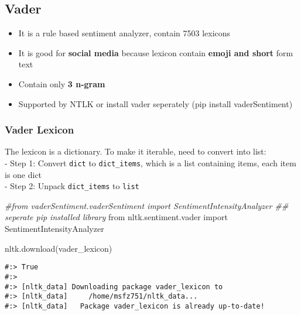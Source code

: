 \documentclass[
]{book}
\newenvironment{Shaded}{\begin{snugshade}}{\end{snugshade}}
\newcommand{\CommentTok}[1]{\textcolor[rgb]{0.37,0.37,0.37}{\textit{#1}}}
\newcommand{\ImportTok}[1]{#1}
\newcommand{\NormalTok}[1]{#1}
\newcommand{\StringTok}[1]{\textcolor[rgb]{0.5,0.5,0.5}{#1}}
\providecommand{\tightlist}{%
  \setlength{\itemsep}{0pt}\setlength{\parskip}{0pt}}
\begin{document}
\hypertarget{vader}{%
\subsection{Vader}\label{vader}}

\begin{itemize}
\tightlist
\item
  It is a rule based sentiment analyzer, contain 7503 lexicons
\item
  It is good for \textbf{social media} because lexicon contain \textbf{emoji and short} form text
\item
  Contain only \textbf{3 n-gram}
\item
  Supported by NTLK or install vader seperately (pip install vaderSentiment)
\end{itemize}

\hypertarget{vader-lexicon}{%
\subsubsection{Vader Lexicon}\label{vader-lexicon}}

The lexicon is a dictionary. To make it iterable, need to convert into list:\\
- Step 1: Convert \texttt{dict} to \texttt{dict\_items}, which is a list containing items, each item is one dict\\
- Step 2: Unpack \texttt{dict\_items} to \texttt{list}

\begin{Shaded}
\begin{Highlighting}[]
\CommentTok{\#from vaderSentiment.vaderSentiment import SentimentIntensityAnalyzer   \#\# seperate pip installed library}
\ImportTok{from}\NormalTok{ nltk.sentiment.vader }\ImportTok{import}\NormalTok{ SentimentIntensityAnalyzer}

\NormalTok{nltk.download(}\StringTok{\textquotesingle{}vader\_lexicon\textquotesingle{}}\NormalTok{)}
\end{Highlighting}
\end{Shaded}

\begin{verbatim}
#:> True
#:> 
#:> [nltk_data] Downloading package vader_lexicon to
#:> [nltk_data]     /home/msfz751/nltk_data...
#:> [nltk_data]   Package vader_lexicon is already up-to-date!
\end{verbatim}
\end{document}

